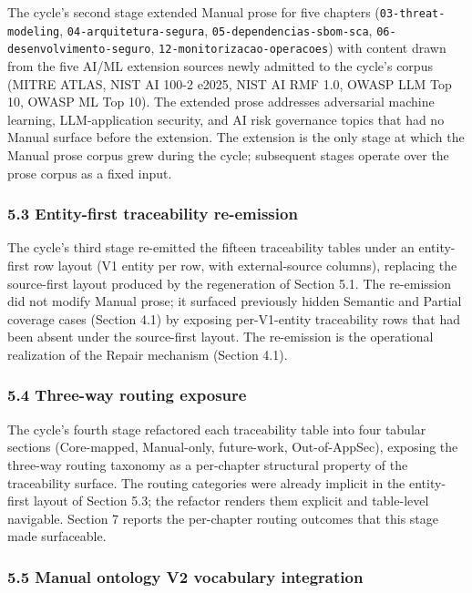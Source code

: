 \documentclass[
]{article}
\begin{document}
The cycle's second stage extended Manual prose for five chapters
(\texttt{03-threat-modeling}, \texttt{04-arquitetura-segura},
\texttt{05-dependencias-sbom-sca}, \texttt{06-desenvolvimento-seguro},
\texttt{12-monitorizacao-operacoes}) with content drawn from the five
AI/ML extension sources newly admitted to the cycle's corpus (MITRE
ATLAS, NIST AI 100-2 e2025, NIST AI RMF 1.0, OWASP LLM Top 10, OWASP ML
Top 10). The extended prose addresses adversarial machine learning,
LLM-application security, and AI risk governance topics that had no
Manual surface before the extension. The extension is the only stage at
which the Manual prose corpus grew during the cycle; subsequent stages
operate over the prose corpus as a fixed input.

\subsubsection{5.3 Entity-first traceability
re-emission}\label{entity-first-traceability-re-emission}

The cycle's third stage re-emitted the fifteen traceability tables under
an entity-first row layout (V1 entity per row, with external-source
columns), replacing the source-first layout produced by the regeneration
of Section 5.1. The re-emission did not modify Manual prose; it surfaced
previously hidden Semantic and Partial coverage cases (Section 4.1) by
exposing per-V1-entity traceability rows that had been absent under the
source-first layout. The re-emission is the operational realization of
the Repair mechanism (Section 4.1).

\subsubsection{5.4 Three-way routing
exposure}\label{three-way-routing-exposure}

The cycle's fourth stage refactored each traceability table into four
tabular sections (Core-mapped, Manual-only, future-work, Out-of-AppSec),
exposing the three-way routing taxonomy as a per-chapter structural
property of the traceability surface. The routing categories were
already implicit in the entity-first layout of Section 5.3; the refactor
renders them explicit and table-level navigable. Section 7 reports the
per-chapter routing outcomes that this stage made surfaceable.

\subsubsection{5.5 Manual ontology V2 vocabulary
integration}\label{manual-ontology-v2-vocabulary-integration}
\end{document}
